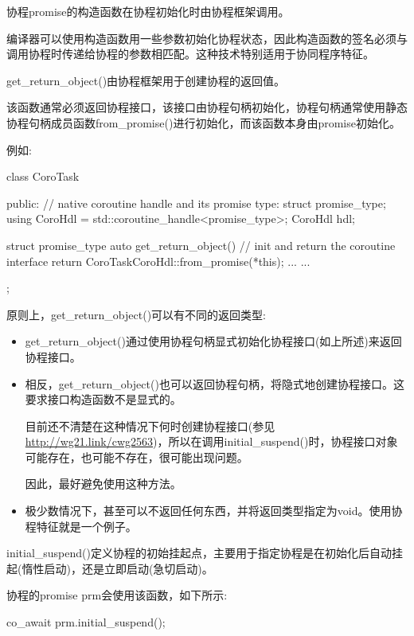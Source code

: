 
协程promise的构造函数在协程初始化时由协程框架调用。

编译器可以使用构造函数用一些参数初始化协程状态，因此构造函数的签名必须与调用协程时传递给协程的参数相匹配。这种技术特别适用于协同程序特征。


get\_return\_object()由协程框架用于创建协程的返回值。

该函数通常必须返回协程接口，该接口由协程句柄初始化，协程句柄通常使用静态协程句柄成员函数from\_promise()进行初始化，而该函数本身由promise初始化。

例如:

\begin{cpp}
class CoroTask {
	public:
	// native coroutine handle and its promise type:
	struct promise_type;
	using CoroHdl = std::coroutine_handle<promise_type>;
	CoroHdl hdl;

	struct promise_type {
		auto get_return_object() { // init and return the coroutine interface
			return CoroTask{CoroHdl::from_promise(*this)};
		}
		...
	}
	...
};
\end{cpp}

原则上，get\_return\_object()可以有不同的返回类型:

\begin{itemize}
\item
get\_return\_object()通过使用协程句柄显式初始化协程接口(如上所述)来返回协程接口。

\item
相反，get\_return\_object()也可以返回协程句柄，将隐式地创建协程接口。这要求接口构造函数不是显式的。

目前还不清楚在这种情况下何时创建协程接口(参见\url{http://wg21.link/cwg2563})，所以在调用initial\_suspend()时，协程接口对象可能存在，也可能不存在，很可能出现问题。

因此，最好避免使用这种方法。

\item
极少数情况下，甚至可以不返回任何东西，并将返回类型指定为void。使用协程特征就是一个例子。
\end{itemize}


initial\_suspend()定义协程的初始挂起点，主要用于指定协程是在初始化后自动挂起(惰性启动)，还是立即启动(急切启动)。

协程的promise prm会使用该函数，如下所示:

\begin{cpp}
co_await prm.initial_suspend();
\end{cpp}

